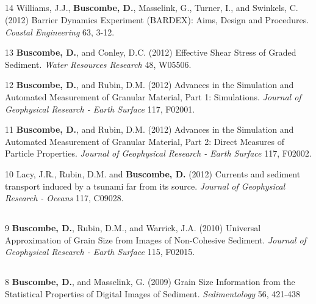 \documentclass[margin,line]{resume}
\begin{document}
\begin{resume}
\begin{footnotesize}
\begin{list1}
	\end{list1}

	\subsection{}
	\begin{list1}
	\item[14] Williams, J.J., {\bf Buscombe, D.}, Masselink, G., Turner, I., and Swinkels, C. (2012) Barrier Dynamics Experiment (BARDEX): Aims, Design and Procedures. {\sl Coastal Engineering} 63, 3-12.\\

	\item[13] {\bf Buscombe, D.}, and Conley, D.C. (2012) Effective Shear Stress of Graded Sediment. {\sl Water Resources Research} 48, W05506.\\

	\item[12] {\bf Buscombe, D.}, and Rubin, D.M. (2012) Advances in the Simulation and Automated Measurement of Granular Material, Part 1: Simulations. {\sl Journal of Geophysical Research - Earth Surface} 117, F02001.\\

	\item[11] {\bf Buscombe, D.}, and Rubin, D.M. (2012) Advances in the Simulation and Automated Measurement of Granular Material, Part 2: Direct Measures of Particle Properties. {\sl Journal of Geophysical Research - Earth Surface} 117, F02002.\\

	\item[10] Lacy, J.R., Rubin, D.M. and {\bf Buscombe, D.} (2012) Currents and sediment transport induced by a tsunami far from its source. {\sl Journal of Geophysical Research - Oceans} 117, C09028.
	\end{list1}

	\subsection{}
	\begin{list1}
	\item[9] {\bf Buscombe, D.}, Rubin, D.M., and Warrick, J.A. (2010) Universal Approximation of Grain Size from Images of Non-Cohesive Sediment. {\sl Journal of Geophysical Research - Earth Surface} 115, F02015.
	\end{list1}
	
	\subsection{}
	\begin{list1}
	\item[8] {\bf Buscombe, D.}, and Masselink, G. (2009) Grain Size Information from the Statistical Properties of Digital Images of Sediment. {\sl Sedimentology} 56, 421-438 \\


\end{list1}
\end{footnotesize}
\end{resume}
\end{document}
